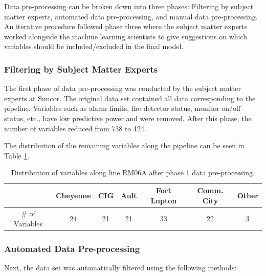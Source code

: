 Data pre-processing can be broken down into three phases: Filtering by subject matter experts, automated data pre-processing, and manual data pre-processing.  An iterative procedure followed phase three where the subject matter experts worked alongside the machine learning scientists to give suggestions on which variables should be included/excluded in the final model.

\subsubsection{Filtering by Subject Matter Experts}
The first phase of data pre-processing was conducted by the subject matter experts at Suncor.  The original data set contained all data corresponding to the pipeline.  Variables such as alarm limits, fire detector status, monitor on/off status, etc., have low predictive power and were removed.  After this phase, the number of variables reduced from 738 to 124.  

The distribution of the remaining variables along the pipeline can be seen in Table \ref{tab:08Ph1Data}.

\begin{table}[h]
    \centering
    {
    \begin{tabular}{ c | c | c | c | c | c | c}
             &  Cheyenne & CIG & Ault & Fort Lupton & Comm. City & Other      \\
        \hline
        \# of Variables  &  24  &  21  &  21  &  33  &  22  &  3  \\
    \end{tabular}}
    \caption{Distribution of variables along line RM06A after phase 1 data pre-processing.}
    \label{tab:08Ph1Data}
\end{table}

\subsubsection{Automated Data Pre-processing}
Next, the data set was automatically filtered using the following methods:

